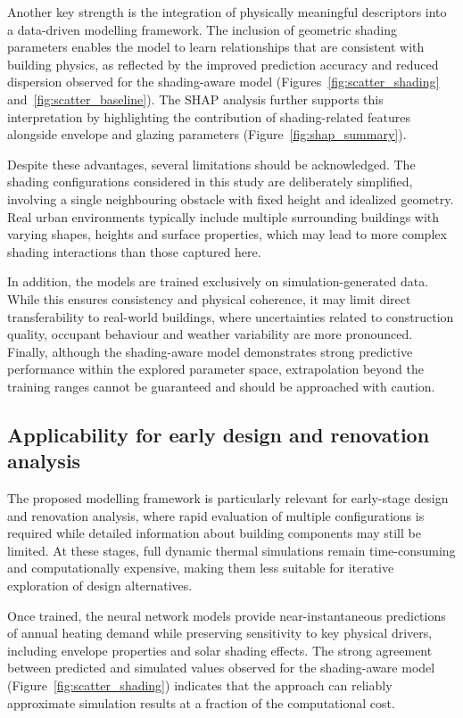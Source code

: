 \documentclass{article}
\begin{document}
Another key strength is the integration of physically meaningful descriptors
into a data-driven modelling framework. The inclusion of geometric shading
parameters enables the model to learn relationships that are consistent with
building physics, as reflected by the improved prediction accuracy and reduced
dispersion observed for the shading-aware model
(Figures~\ref{fig:scatter_shading} and~\ref{fig:scatter_baseline}). The SHAP
analysis further supports this interpretation by highlighting the contribution
of shading-related features alongside envelope and glazing parameters
(Figure~\ref{fig:shap_summary}).

Despite these advantages, several limitations should be acknowledged. The
shading configurations considered in this study are deliberately simplified,
involving a single neighbouring obstacle with fixed height and idealized
geometry. Real urban environments typically include multiple surrounding
buildings with varying shapes, heights and surface properties, which may lead
to more complex shading interactions than those captured here.

In addition, the models are trained exclusively on simulation-generated data.
While this ensures consistency and physical coherence, it may limit direct
transferability to real-world buildings, where uncertainties related to
construction quality, occupant behaviour and weather variability are more
pronounced. Finally, although the shading-aware model demonstrates strong
predictive performance within the explored parameter space, extrapolation
beyond the training ranges cannot be guaranteed and should be approached with
caution.
\subsection{Applicability for early design and renovation analysis}
The proposed modelling framework is particularly relevant for early-stage design
and renovation analysis, where rapid evaluation of multiple configurations is
required while detailed information about building components may still be
limited. At these stages, full dynamic thermal simulations remain time-consuming
and computationally expensive, making them less suitable for iterative
exploration of design alternatives.

Once trained, the neural network models provide near-instantaneous predictions
of annual heating demand while preserving sensitivity to key physical drivers,
including envelope properties and solar shading effects. The strong agreement
between predicted and simulated values observed for the shading-aware model
(Figure~\ref{fig:scatter_shading}) indicates that the approach can reliably
approximate simulation results at a fraction of the computational cost.
\end{document}
